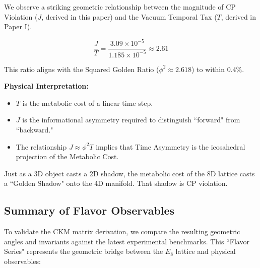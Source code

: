 We observe a striking geometric relationship between the magnitude of CP Violation ($J$, derived in this paper) and the Vacuum Temporal Tax ($T$, derived in Paper I).

\begin{equation}
\frac{J}{T} = \frac{3.09 \times 10^{-5}}{1.185 \times 10^{-5}} \approx \mathbf{2.61}
\end{equation}

This ratio aligns with the Squared Golden Ratio ($\phi^2 \approx 2.618$) to within 0.4\%.

\textbf{Physical Interpretation:}
\begin{itemize}
    \item $T$ is the metabolic cost of a linear time step.
    \item $J$ is the informational asymmetry required to distinguish ``forward" from ``backward."
    \item The relationship $J \approx \phi^2 T$ implies that Time Asymmetry is the icosahedral projection of the Metabolic Cost.
\end{itemize}

Just as a 3D object casts a 2D shadow, the metabolic cost of the 8D lattice casts a ``Golden Shadow" onto the 4D manifold. That shadow is CP violation.

\subsection{Summary of Flavor Observables}

To validate the CKM matrix derivation, we compare the resulting geometric angles and invariants against the latest experimental benchmarks. This ``Flavor Series" represents the geometric bridge between the $E_8$ lattice and physical observables:

